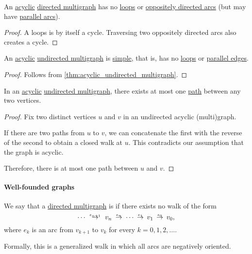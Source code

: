 \begin{proposition}\label{thm:acyclic_directed_multigraph}
  An \hyperref[def:acyclic_graph]{acyclic} \hyperref[def:directed_multigraph]{directed multigraph} has no \hyperref[def:directed_multigraph/loop]{loops} or \hyperref[def:directed_multigraph/parallel]{oppositely directed arcs} (but may have \hyperref[def:directed_multigraph/parallel]{parallel arcs}).
\end{proposition}
\begin{proof}
  A loops is by itself a cycle. Traversing two oppositely directed arcs also creates a cycle.
\end{proof}

\begin{proposition}\label{thm:acyclic_undirected_multigraph}
  An \hyperref[def:acyclic_graph]{acyclic} \hyperref[def:hypergraph/multigraph]{undirected multigraph} is \hyperref[def:undirected_graph]{simple}, that is, has no \hyperref[def:hypergraph/loop]{loops} or \hyperref[def:hypergraph/parallel]{parallel edges}.
\end{proposition}
\begin{proof}
  Follows from \cref{thm:acyclic_undirected_multigraph}.
\end{proof}

\begin{proposition}\label{thm:acyclic_graph_paths}
  In an \hyperref[def:acyclic_graph]{acyclic} \hyperref[def:hypergraph/multigraph]{undirected multigraph}, there exists at most one \hyperref[def:graph_walk/path]{path} between any two vertices.
\end{proposition}
\begin{proof}
  Fix two distinct vertices \( u \) and \( v \) in an undirected acyclic (multi)graph.

  If there are two paths from \( u \) to \( v \), we can concatenate the first with the reverse of the second to obtain a closed walk at \( u \). This contradicts our assumption that the graph is acyclic.

  Therefore, there is at most one path between \( u \) and \( v \).
\end{proof}

\paragraph{Well-founded graphs}

\begin{definition}\label{def:well_founded_graph}\mimprovised
  We say that a \hyperref[def:directed_multigraph]{directed multigraph} is  if there exists no walk of the form
  \begin{equation}
    \cdots \reloset {e_{n+1}} \to v_n \reloset {e_n} \to \cdots \reloset {e_1} \to v_1 \reloset {e_0} \to v_0,
  \end{equation}
  where \( e_k \) is an arc from \( v_{k+1} \) to \( v_k \) for every \( k = 0, 1, 2, \ldots \).
\end{definition}
\begin{comments}
  \item Formally, this is a generalized walk in which all arcs are negatively oriented.
\end{comments}

